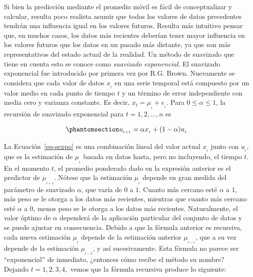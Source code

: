 \documentclass[
  us-letterpaper,
]{scrreprt}
\theoremstyle{definition}
\theoremstyle{plain}
\theoremstyle{plain}
\theoremstyle{definition}
\theoremstyle{remark}
\begin{document}
Si bien la predicción mediante el promedio móvil es fácil de
conceptualizar y calcular, resulta poco realista asumir que todos los
valores de datos precedentes tendrán una influencia igual en los valores
futuros. Resulta más intuitivo pensar que, en muchos casos, los datos
más recientes deberían tener mayor influencia en los valores futuros que
los datos en un pasado más distante, ya que son más representativos del
estado actual de la realidad. Un método de suavizado que tiene en cuenta
esto se conoce como \emph{suavizado exponencial}. El suavizado
exponencial fue introducido por primera vez por R.G. Brown. Nuevamente
se considera que cada valor de datos \(x_{_t}\) en una serie temporal
está compuesto por un valor medio en cada punto de tiempo \(t\) y un
término de error independiente con media cero y varianza constante. Es
decir, \(x_{t}=\mu_{_t}+e_{_t}\). Para \(0 \leq \alpha \leq 1\), la
recursión de suavizado exponencial para \(t =1, 2, \ldots, n\) es

\begin{equation}\phantomsection\label{eq-sexpo}{
u_{_{t+1}}=\alpha x_{_t}+ (1-\alpha)u_{_t}
}\end{equation}

La Ecuación~\ref{eq-sexpo} es una combinación lineal del valor actual
\(x_{_t}\) junto con \(u_{_t}\), que es la estimación de \(\mu_{_t}\)
basada en datos hasta, pero no incluyendo, el tiempo \(t\). En el
momento \(t\), el promedio ponderado dado en la expresión anterior es el
predictor de \(\mu_{_{t+1}}\). Nótese que la estimación \(\mu_{_t}\)
depende en gran medida del parámetro de suavizado \(\alpha\), que varía
de \(0\) a \(1\). Cuanto más cercano esté \(\alpha\) a \(1\), más peso
se le otorga a los datos más recientes, mientras que cuanto más cercano
esté \(\alpha\) a \(0\), menos peso se le otorga a los datos más
recientes. Naturalmente, el valor óptimo de \(\alpha\) dependerá de la
aplicación particular del conjunto de datos y se puede ajustar en
consecuencia. Debido a que la fórmula anterior es recursiva, cada nueva
estimación \(\mu_{_t}\) depende de la estimación anterior
\(\mu_{_{t-1}}\), que a su vez depende de la estimación
\(\mu_{_{t-2}}\), y así sucesivamente. Esta fórmula no parece ser
``exponencial'' de inmediato, ¿entonces cómo recibe el método su nombre?
Dejando \(t = 1, 2, 3, 4,\) vemos que la fórmula recursiva produce lo
siguiente:
\end{document}
